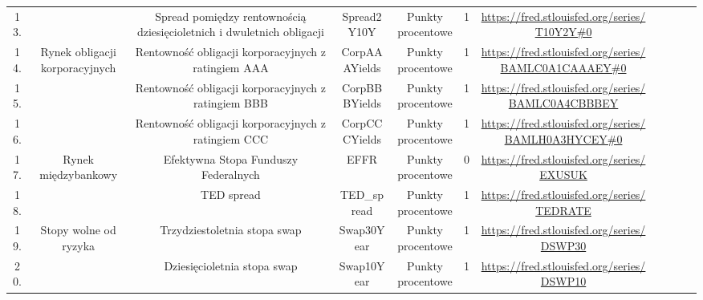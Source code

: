 \begin{landscape}
\begin{table}[h]
\begin{tabular}{|c|c|c|c|c|c|c|llll}
13.           &                                                  & Spread pomiędzy rentownością dziesięcioletnich i dwuletnich obligacji                 & Spread2Y10Y                      & Punkty procentowe  & 1 & \url{https://fred.stlouisfed.org/series/T10Y2Y\#0}        &  &  &  &  \\ \cline{1-7}
14.           & \multirow{3}{*}{Rynek obligacji korporacyjnych}  & Rentowność obligacji korporacyjnych z ratingiem AAA & CorpAAAYields                    & Punkty procentowe    & 1 & \url{https://fred.stlouisfed.org/series/BAMLC0A1CAAAEY\#0} &  &  &  &  \\ \cline{1-1} \cline{3-7}
15.           &                                                  & Rentowność obligacji korporacyjnych z ratingiem BBB                                        & CorpBBBYields                    & Punkty procentowe    &  1 & \url{https://fred.stlouisfed.org/series/BAMLC0A4CBBBEY}    &  &  &  &  \\ \cline{1-1} \cline{3-7}
16.           &                                                  & Rentowność obligacji korporacyjnych z ratingiem CCC                              & CorpCCCYields                    & Punkty procentowe    & 1  & \url{https://fred.stlouisfed.org/series/BAMLH0A3HYCEY\#0}  &  &  &  &  \\ \cline{1-7}
17.           & \multirow{2}{*}{Rynek międzybankowy}             & Efektywna Stopa Funduszy Federalnych & EFFR                             & Punkty procentowe    &  0   & \url{https://fred.stlouisfed.org/series/EXUSUK}           &  &  &  &  \\ \cline{1-1} \cline{3-7}
18.           &                                                  & TED spread                                                                                 & TED\_spread                      & Punkty procentowe    &  1   & \url{https://fred.stlouisfed.org/series/TEDRATE}         &  &  &  &  \\ \cline{1-7}
19.           & \multirow{3}{*}{Stopy wolne od ryzyka}           & Trzydziestoletnia stopa swap                                                                          & Swap30Year                       & Punkty procentowe    &  1 & \url{https://fred.stlouisfed.org/series/DSWP30}           &  &  &  &  \\ \cline{1-1} \cline{3-7}
20.           &                                                  & Dziesięcioletnia stopa swap                                                                          & Swap10Year                       & Punkty procentowe    &  1  & \url{https://fred.stlouisfed.org/series/DSWP10}           &  &  &  &  \\ \cline{1-1} \cline{3-7}

\end{tabular}
\end{table}
\end{landscape}
